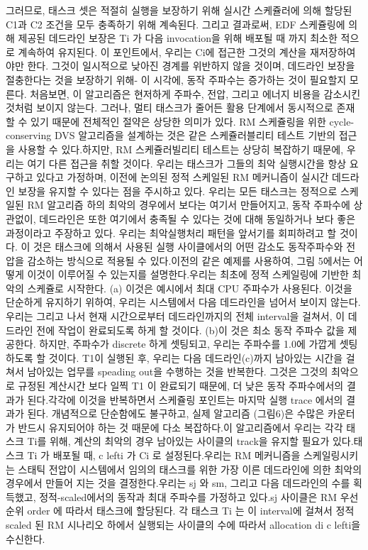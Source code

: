 \documentclass[11pt
  , a4paper
  , article
  , oneside
]{memoir}
\begin{document}
그러므로, 태스크 셋은 적절히 실행을 보장하기 위해 실시간 스케쥴러에 의해 할당된 C1과 C2 조건을 모두 충족하기 위해 계속된다. 그리고 결과로써, EDF 스케쥴링에 의해 제공된 데드라인 보장은 Ti 가 다음 invocation을 위해 배포될 때 까지 최소한 적으로 계속하여 유지된다. 이 포인트에서, 우리는 Ci에 접근한 그것의 계산을 재저장하여야만 한다. 그것이 일시적으로 낮아진 경계를 위반하지 않을 것이며, 데드라인 보장을 절충한다는 것을 보장하기 위해- 이 시각에, 동작 주파수는 증가하는 것이 필요할지 모른다. 처음보면, 이 알고리즘은 현저하게 주파수, 전압, 그리고 에너지 비용을 감소시킨 것처럼 보이지 않는다. 그러나, 멀티 태스크가 줄어든 활용 단계에서 동시적으로 존재할 수 있기 때문에 전체적인 절약은 상당한 의미가 있다. RM 스케쥴링을 위한 cycle-conserving DVS 알고리즘을 설계하는 것은 같은 스케쥴러블리티 테스트 기반의 접근을 사용할 수 있다.하지만, RM 스케쥴러빌리티 테스트는 상당히 복잡하기 때문에, 우리는 여기 다른 접근을 취할 것이다. 우리는 태스크가 그들의 최악 실행시간을 항상 요구하고 있다고 가정하며, 이전에 논의된 정적 스케일된 RM 메커니즘이 실시간 데드라인 보장을 유지할 수 있다는 점을 주시하고 있다. 우리는 모든 태스크는 정적으로 스케일된 RM 알고리즘 하의 최악의 경우에서 보다는 여기서 만들어지고, 동작 주파수에 상관없이, 데드라인은 또한 여기에서 충족될 수 있다는 것에 대해 동일하거나 보다 좋은 과정이라고 주장하고 있다. 우리는 최악실행처리 패턴을 앞서기를 회피하려고 할 것이다. 이 것은 태스크에 의해서 사용된 실행 사이클에서의 어떤 감소도 동작주파수와 전압을 감소하는 방식으로 적용될 수 있다.이전의 같은 예제를 사용하여, 그림 5에서는 어떻게 이것이 이루어질 수 있는지를 설명한다.우리는 최초에 정적 스케일링에 기반한 최악의 스케쥴로 시작한다. (a) 이것은 예시에서 최대 CPU 주파수가 사용된다. 이것을 단순하게 유지하기 위하여, 우리는 시스템에서 다음 데드라인을 넘어서 보이지 않는다.우리는 그리고 나서 현재 시간으로부터 데드라인까지의 전체 interval을 걸쳐서, 이 데드라인 전에 작업이 완료되도록 하게 할 것이다. (b)이 것은 최소 동작 주파수 값을 제공한다. 하지만, 주파수가 discrete 하게 셋팅되고, 우리는 주파수를 1.0에 가깝게 셋팅하도록 할 것이다. 
T1이 실행된 후, 우리는 다음 데드라인(c)까지 남아있는 시간을 걸쳐서 남아있는 업무를 speading out을 수행하는 것을 반복한다. 그것은 그것의 최악으로 규정된 계산시간 보다 일찍 T1 이 완료되기 때문에, 더 낮은 동작 주파수에서의 결과가 된다.각각에 이것을 반복하면서 스케쥴링 포인트는 마지막 실행 trace 에서의 결과가 된다. 개념적으로 단순함에도 불구하고, 실제 알고리즘 (그림6)은 수많은 카운터가 반드시 유지되어야 하는 것 때문에 다소 복잡하다.이 알고리즘에서 우리는 각각 태스크 Ti를 위해,  계산의 최악의 경우 남아있는 사이클의 track을 유지할 필요가 있다.태스크 Ti 가 배포될 때, c lefti 가 Ci 로 설정된다.우리는 RM  메커니즘을 스케일링시키는 스태틱 전압이 시스템에서 임의의 태스크를 위한 가장 이른 데드라인에 의한 최악의 경우에서 만들어 지는 것을 결정한다.우리는 sj 와 sm, 그리고 다음 데드라인의 수를 획득했고, 정적-scaled에서의 동작과 최대 주파수를 가정하고 있다.sj 사이클은 RM 우선순위 order 에 따라서 태스크에 할당된다. 각 태스크 Ti 는 이 interval에 걸쳐서 정적 scaled 된 RM 시나리오 하에서 실행되는 사이클의 수에 따라서 allocation di c lefti을 수신한다. 
\end{document}
